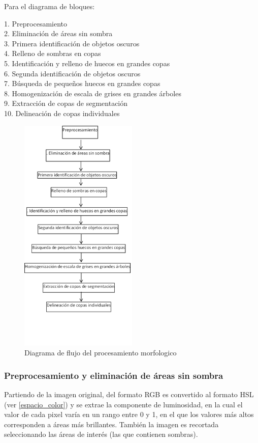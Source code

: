 Para el diagrama de bloques:

1. Preprocesamiento\\
2. Eliminación de áreas sin sombra\\
3. Primera identificación de objetos oscuros\\
4. Relleno de sombras en copas\\
5. Identificación y relleno de huecos en grandes copas\\
6. Segunda identificación de objetos oscuros\\
7. Búsqueda de pequeños huecos en grandes copas\\
8. Homogenización de escala de grises en grandes árboles\\
9. Extracción de copas de segmentación\\
10.  Delineación de copas individuales\\

\begin{figure}[h!]
    \centering
    \includegraphics[width=0.5\textwidth]{Imagenes/Morfologico/flowchart_morfologico.png}
     \hfill
     \caption{Diagrama de flujo del procesamiento morfologico}
    \label{flowchart_morfologico}
\end{figure}


\subsubsection{Preprocesamiento y eliminación de áreas sin sombra}
Partiendo de la imagen original, del formato RGB es convertido al formato HSL (ver \ref{espacio_color}) y se extrae la componente de luminosidad, en la cual el valor de cada pixel varía en un rango entre 0 y 1, en el que los valores más altos corresponden a áreas más brillantes. También la imagen es recortada seleccionando las áreas de interés (las que contienen sombras).
